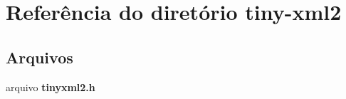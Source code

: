 \section{Referência do diretório tiny-\/xml2}
\label{dir_70394a862dda5a62bab6009828fd9ff2}
\subsection*{Arquivos}
\begin{DoxyCompactItemize}
\item 
arquivo {\bf tinyxml2.\+h}
\end{DoxyCompactItemize}
